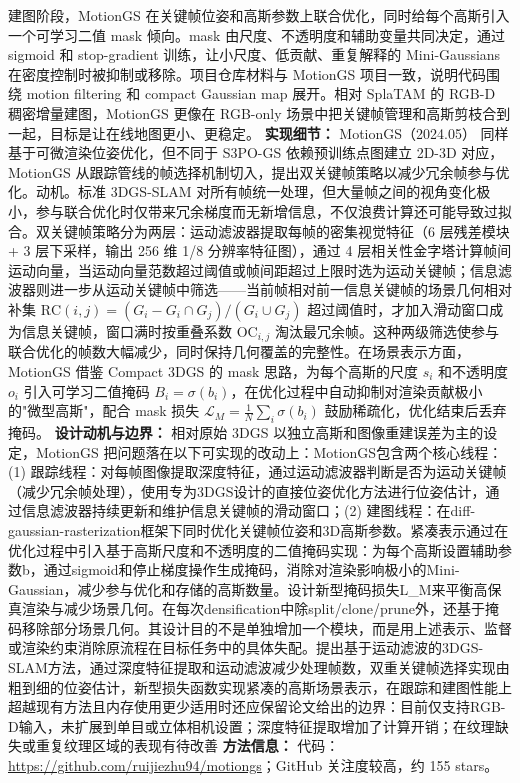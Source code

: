 建图阶段，MotionGS 在关键帧位姿和高斯参数上联合优化，同时给每个高斯引入一个可学习二值 mask 倾向。mask 由尺度、不透明度和辅助变量共同决定，通过 sigmoid 和 stop-gradient 训练，让小尺度、低贡献、重复解释的 Mini-Gaussians 在密度控制时被抑制或移除。项目仓库材料与 MotionGS 项目一致，说明代码围绕 motion filtering 和 compact Gaussian map 展开。相对 SplaTAM 的 RGB-D 稠密增量建图，MotionGS 更像在 RGB-only 场景中把关键帧管理和高斯剪枝合到一起，目标是让在线地图更小、更稳定。
\textbf{实现细节：} MotionGS（2024.05） 同样基于可微渲染位姿优化，但不同于 S3PO-GS 依赖预训练点图建立 2D-3D 对应，MotionGS 从跟踪管线的帧选择机制切入，提出双关键帧策略以减少冗余帧参与优化。动机。标准 3DGS-SLAM 对所有帧统一处理，但大量帧之间的视角变化极小，参与联合优化时仅带来冗余梯度而无新增信息，不仅浪费计算还可能导致过拟合。双关键帧策略分为两层：运动滤波器提取每帧的密集视觉特征（6 层残差模块 + 3 层下采样，输出 256 维 1/8 分辨率特征图），通过 4 层相关性金字塔计算帧间运动向量，当运动向量范数超过阈值或帧间距超过上限时选为运动关键帧；信息滤波器则进一步从运动关键帧中筛选——当前帧相对前一信息关键帧的场景几何相对补集 $\mathrm{RC}(i,j) = (G_i - G_i \cap G_j)/(G_i \cup G_j)$ 超过阈值时，才加入滑动窗口成为信息关键帧，窗口满时按重叠系数 $\mathrm{OC}_{i,j}$ 淘汰最冗余帧。这种两级筛选使参与联合优化的帧数大幅减少，同时保持几何覆盖的完整性。在场景表示方面，MotionGS 借鉴 Compact 3DGS 的 mask 思路，为每个高斯的尺度 $s_i$ 和不透明度 $o_i$ 引入可学习二值掩码 $B_i = \sigma(b_i)$，在优化过程中自动抑制对渲染贡献极小的"微型高斯"，配合 mask 损失 $\mathcal{L}_M = \frac{1}{N}\sum_{i}\sigma(b_i)$ 鼓励稀疏化，优化结束后丢弃掩码。
\textbf{设计动机与边界：} 相对原始 3DGS 以独立高斯和图像重建误差为主的设定，MotionGS 把问题落在以下可实现的改动上：MotionGS包含两个核心线程：(1) 跟踪线程：对每帧图像提取深度特征，通过运动滤波器判断是否为运动关键帧（减少冗余帧处理），使用专为3DGS设计的直接位姿优化方法进行位姿估计，通过信息滤波器持续更新和维护信息关键帧的滑动窗口；(2) 建图线程：在diff-gaussian-rasterization框架下同时优化关键帧位姿和3D高斯参数。紧凑表示通过在优化过程中引入基于高斯尺度和不透明度的二值掩码实现：为每个高斯设置辅助参数b，通过sigmoid和停止梯度操作生成掩码，消除对渲染影响极小的Mini-Gaussian，减少参与优化和存储的高斯数量。设计新型掩码损失L\_M来平衡高保真渲染与减少场景几何。在每次densification中除split/clone/prune外，还基于掩码移除部分场景几何。其设计目的不是单独增加一个模块，而是用上述表示、监督或渲染约束消除原流程在目标任务中的具体失配。提出基于运动滤波的3DGS-SLAM方法，通过深度特征提取和运动滤波减少处理帧数，双重关键帧选择实现由粗到细的位姿估计，新型损失函数实现紧凑的高斯场景表示，在跟踪和建图性能上超越现有方法且内存使用更少适用时还应保留论文给出的边界：目前仅支持RGB-D输入，未扩展到单目或立体相机设置；深度特征提取增加了计算开销；在纹理缺失或重复纹理区域的表现有待改善
\textbf{方法信息：} 代码：\url{https://github.com/ruijiezhu94/motiongs}；GitHub 关注度较高，约 155 stars。



